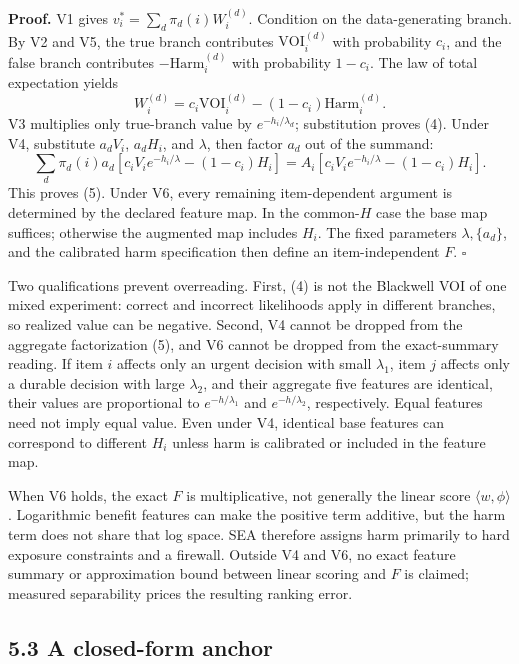\documentclass[
  11pt]{article}
\begin{document}
\textbf{Proof.} V1 gives \(v_i^*=\sum_d\pi_d(i)W_i^{(d)}\). Condition on the data-generating branch. By V2 and V5, the true branch contributes \(\mathrm{VOI}_i^{(d)}\) with probability \(c_i\), and the false branch contributes \(-\mathrm{Harm}_i^{(d)}\) with probability \(1-c_i\). The law of total expectation yields \[
W_i^{(d)}=c_i\mathrm{VOI}_i^{(d)}-(1-c_i)\mathrm{Harm}_i^{(d)}.
\] V3 multiplies only true-branch value by \(e^{-h_i/\lambda_d}\); substitution proves (4). Under V4, substitute \(a_dV_i\), \(a_dH_i\), and \(\lambda\), then factor \(a_d\) out of the summand: \[
\sum_d\pi_d(i)a_d[c_iV_ie^{-h_i/\lambda}-(1-c_i)H_i]
=A_i[c_iV_ie^{-h_i/\lambda}-(1-c_i)H_i].
\] This proves (5). Under V6, every remaining item-dependent argument is determined by the declared feature map. In the common-\(H\) case the base map suffices; otherwise the augmented map includes \(H_i\). The fixed parameters \(\lambda,\{a_d\}\), and the calibrated harm specification then define an item-independent \(F\). \(\square\)

Two qualifications prevent overreading. First, (4) is not the Blackwell VOI of one mixed experiment: correct and incorrect likelihoods apply in different branches, so realized value can be negative. Second, V4 cannot be dropped from the aggregate factorization (5), and V6 cannot be dropped from the exact-summary reading. If item \(i\) affects only an urgent decision with small \(\lambda_1\), item \(j\) affects only a durable decision with large \(\lambda_2\), and their aggregate five features are identical, their values are proportional to \(e^{-h/\lambda_1}\) and \(e^{-h/\lambda_2}\), respectively. Equal features need not imply equal value. Even under V4, identical base features can correspond to different \(H_i\) unless harm is calibrated or included in the feature map.

When V6 holds, the exact \(F\) is multiplicative, not generally the linear score \(\langle w,\phi\rangle\). Logarithmic benefit features can make the positive term additive, but the harm term does not share that log space. SEA therefore assigns harm primarily to hard exposure constraints and a firewall. Outside V4 and V6, no exact feature summary or approximation bound between linear scoring and \(F\) is claimed; measured separability prices the resulting ranking error.

\subsection{5.3 A closed-form anchor}\label{a-closed-form-anchor}
\end{document}
